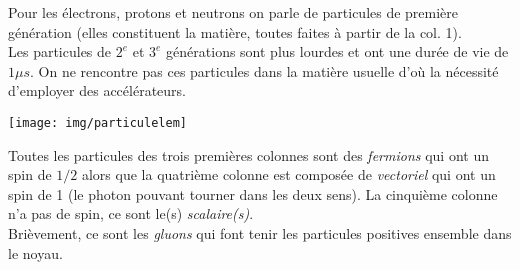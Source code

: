 \documentclass[british,french,11pt, a4paper, openany]{book}
\begin{document}
	Pour les électrons, protons et neutrons on parle de particules de première génération (elles constituent la matière, toutes faites à partir de la col. 1).\\
	Les particules de $2^e$ et $3^e$ générations sont plus lourdes et ont une durée de vie de $1 \mu s$. On ne rencontre pas ces particules dans la matière usuelle d'où la nécessité d'employer des accélérateurs.\\
	\begin{center}
		\texttt{[image: img/particulelem]}
	\end{center}
	Toutes les particules des trois premières colonnes sont des \textit{fermions} qui ont un spin de $1/2$ alors que la quatrième colonne est composée de \textit{vectoriel} qui ont un spin de 1 (le photon pouvant tourner dans les deux sens). La cinquième colonne n'a pas de spin, ce sont le(s) \textit{scalaire(s)}.\\
	Brièvement, ce sont les \textit{gluons} qui font tenir les particules positives ensemble dans le noyau.
	
\end{document}
